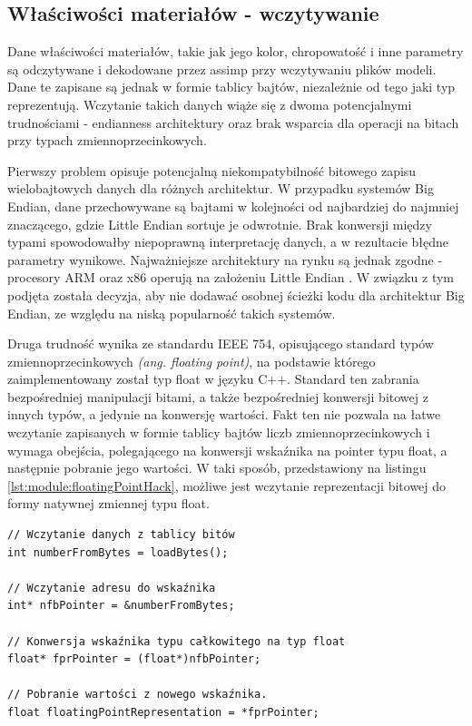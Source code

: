 
\subsection{Właściwości materiałów - wczytywanie}
Dane właściwości materiałów, takie jak jego kolor, chropowatość i inne parametry są odczytywane i dekodowane przez assimp przy wczytywaniu plików modeli. Dane te zapisane są jednak w formie tablicy bajtów, niezależnie od tego jaki typ reprezentują. Wczytanie takich danych wiąże się z dwoma potencjalnymi trudnościami - endianness architektury oraz brak wsparcia dla operacji na bitach przy typach zmiennoprzecinkowych.

Pierwszy problem opisuje potencjalną niekompatybilność bitowego zapisu wielobajtowych danych dla różnych architektur. W przypadku systemów Big Endian, dane przechowywane są bajtami w kolejności od najbardziej do najmniej znaczącego, gdzie Little Endian sortuje je odwrotnie. Brak konwersji między typami spowodowałby niepoprawną interpretację danych, a w rezultacie błędne parametry wynikowe. Najważniejsze architektury na rynku są jednak zgodne - procesory ARM oraz x86 operują na założeniu Little Endian \cite{ARM:Developer:Endianness} \cite{Oracle:HelpCenter:x86ByteOrdering}. W związku z tym podjęta została decyzja, aby nie dodawać osobnej ścieżki kodu dla architektur Big Endian, ze względu na niską popularność takich systemów.

Druga trudność wynika ze standardu IEEE 754, opisującego standard typów zmiennoprzecinkowych \textit{(ang. floating point)}, na podstawie którego zaimplementowany został typ float w języku C++. Standard ten zabrania bezpośredniej manipulacji bitami, a także bezpośredniej konwersji bitowej z innych typów, a jedynie na konwersję wartości. Fakt ten nie pozwala na łatwe wczytanie zapisanych w formie tablicy bajtów liczb zmiennoprzecinkowych i wymaga obejścia, polegającego na konwersji wskaźnika na pointer typu float, a następnie pobranie jego wartości.  W taki sposób, przedstawiony na listingu \ref{lst:module:floatingPointHack}, możliwe jest wczytanie reprezentacji bitowej do formy natywnej zmiennej typu float.

\begin{lstlisting}[caption={Bitowa konwersja typu całkowitego na float w C++}, label={lst:module:floatingPointHack}]
// Wczytanie danych z tablicy bitów
int numberFromBytes = loadBytes();

// Wczytanie adresu do wskaźnika
int* nfbPointer = &numberFromBytes;

// Konwersja wskaźnika typu całkowitego na typ float
float* fprPointer = (float*)nfbPointer;

// Pobranie wartości z nowego wskaźnika.
float floatingPointRepresentation = *fprPointer;
\end{lstlisting}


